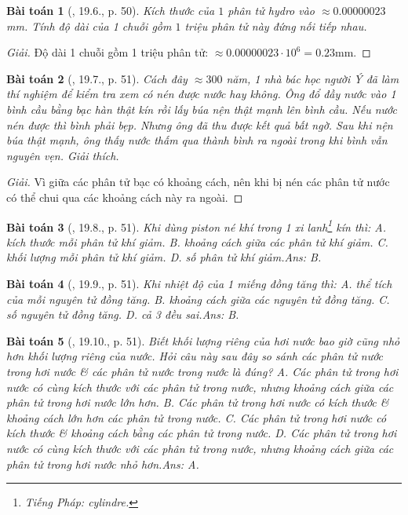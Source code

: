 \documentclass{article}
\newtheorem{baitoan}{Bài toán}
\begin{document}
\begin{baitoan}[\cite{SBT_Vat_Ly_8}, 19.6., p. 50]
	Kích thước của $1$ phân tử hydro vào $\approx0.00000023$\emph{mm}. Tính độ dài của 1 chuỗi gồm $1$ triệu phân tử này đứng nối tiếp nhau.
\end{baitoan}

\begin{proof}[Giải]
	Độ dài 1 chuỗi gồm 1 triệu phân tử: $\approx0.00000023\cdot10^6 = 0.23$mm.
\end{proof}

\begin{baitoan}[\cite{SBT_Vat_Ly_8}, 19.7., p. 51]
	Cách đây $\approx300$ năm, 1 nhà bác học người Ý đã làm thí nghiệm để kiểm tra xem có nén được nước hay không. Ông đổ đầy nước vào 1 bình cầu bằng bạc hàn thật kín rồi lấy búa nện thật mạnh lên bình cầu. Nếu nước nén được thì bình phải bẹp. Nhưng ông đã thu được kết quả bất ngờ. Sau khi nện búa thật mạnh, ông thấy nước thấm qua thành bình ra ngoài trong khi bình vẫn nguyên vẹn. Giải thích.
\end{baitoan}

\begin{proof}[Giải]
	Vì giữa các phân tử bạc có khoảng cách, nên khi bị nén các phân tử nước có thể chui qua các khoảng cách này ra ngoài.
\end{proof}

\begin{baitoan}[\cite{SBT_Vat_Ly_8}, 19.8., p. 51]
	Khi dùng piston né khí trong 1 xi lanh\footnote{Tiếng Pháp: \emph{cylindre}.} kín thì: {\sf A.} kích thước mỗi phân tử khí giảm. {\sf B.} khoảng cách giữa các phân tử khí giảm. {\sf C.} khối lượng mỗi phân tử khí giảm. {\sf D.} số phân tử khí giảm.\hfill{\sf Ans: B.}
\end{baitoan}

\begin{baitoan}[\cite{SBT_Vat_Ly_8}, 19.9., p. 51]
	Khi nhiệt độ của 1 miếng đồng tăng thì: {\sf A.} thể tích của mỗi nguyên tử đồng tăng. {\sf B.} khoảng cách giữa các nguyên tử đồng tăng. {\sf C.} số nguyên tử đồng tăng. {\sf D.} cả 3 đều sai.\hfill{\sf Ans: B.}
\end{baitoan}

\begin{baitoan}[\cite{SBT_Vat_Ly_8}, 19.10., p. 51]
	Biết khối lượng riêng của hơi nước bao giờ cũng nhỏ hơn khối lượng riêng của nước. Hỏi câu này sau đây so sánh các phân tử nước trong hơi nước \& các phân tử nước trong nước là đúng? {\sf A.} Các phân tử trong hơi nước có cùng kích thước với các phân tử trong nước, nhưng khoảng cách giữa các phân tử trong hơi nước lớn hơn. {\sf B.} Các phân tử trong hơi nước có kích thước \& khoảng cách lớn hơn các phân tử trong nước. {\sf C.} Các phân tử trong hơi nước có kích thước \& khoảng cách bằng các phân tử trong nước. {\sf D.} Các phân tử trong hơi nước có cùng kích thước với các phân tử trong nước, nhưng khoảng cách giữa các phân tử trong hơi nước nhỏ hơn.\hfill{\sf Ans: A.}
\end{baitoan}
\end{document}
